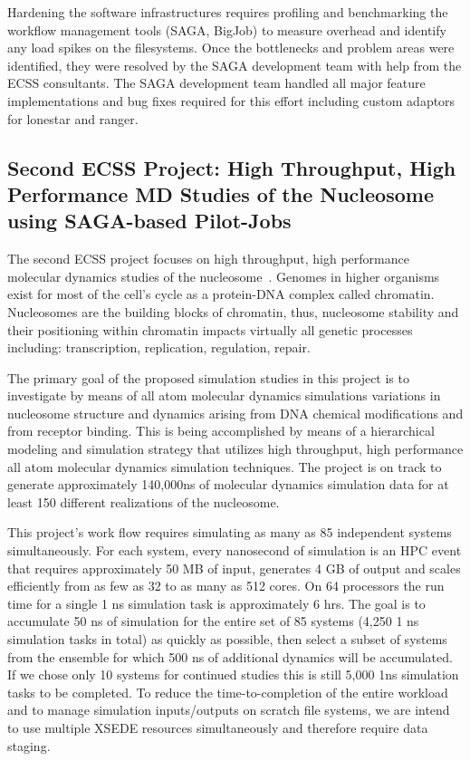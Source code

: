\documentclass{sig-alternate}
\begin{document}
Hardening the software infrastructures requires profiling and benchmarking the
workflow management tools (SAGA, BigJob) to measure overhead and identify any
load spikes on the filesystems. Once the bottlenecks and problem areas were
identified, they were resolved by the SAGA development team with help from
the ECSS consultants. The SAGA development team handled all major feature
implementations and bug fixes required for this effort including custom
adaptors for lonestar and ranger. 

\subsection{Second ECSS Project: High Throughput, High Performance MD Studies of the Nucleosome
using SAGA-based Pilot-Jobs}
The second ECSS project focuses on high throughput, high performance molecular
dynamics studies of the nucleosome~\cite{TomBishop}. Genomes in higher organisms
exist for most of the cell's cycle as a protein-DNA complex called chromatin.
Nucleosomes are the building blocks of chromatin, thus, nucleosome stability and
their positioning within chromatin impacts virtually all genetic processes
including: transcription, replication, regulation, repair.

The primary goal of the proposed simulation studies in this project is to
investigate by means of all atom molecular dynamics simulations variations in
nucleosome structure and dynamics arising from DNA chemical modifications and
from receptor binding. This is being accomplished by means of a hierarchical
modeling and simulation strategy that utilizes high throughput, high
performance all atom molecular dynamics simulation techniques. The project is
on track to generate approximately 140,000ns of molecular dynamics simulation
data for at least 150 different realizations of the nucleosome.

This project's work flow requires simulating as many as 85 independent systems
simultaneously. For each system, every nanosecond of simulation is an HPC event
that requires approximately 50 MB of input, generates 4 GB of output and scales
efficiently from as few as 32 to as many as 512 cores. On 64 processors the run
time for a single 1 ns simulation task is approximately 6 hrs. The goal is to
accumulate 50 ns of simulation for the entire set of 85 systems (4,250 1 ns
simulation tasks in total) as quickly as possible, then select a subset of
systems from the ensemble for which 500 ns of additional dynamics will be
accumulated. If we chose only 10 systems for continued studies this is still
5,000 1ns simulation tasks to be completed. To reduce the time-to-completion of
the entire workload and to manage simulation inputs/outputs on scratch file
systems, we are intend to use multiple XSEDE resources simultaneously and
therefore require data staging.
\end{document}
